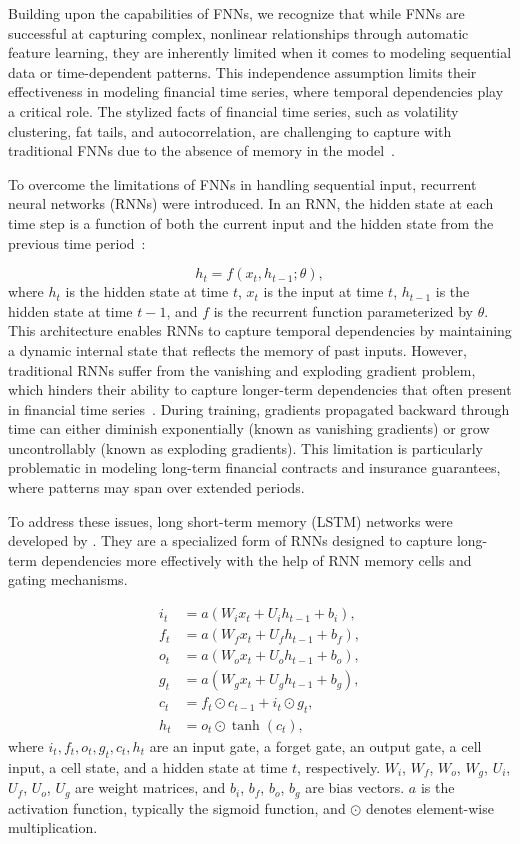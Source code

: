 Building upon the capabilities of FNNs, we recognize that while FNNs are successful at capturing complex, nonlinear relationships through automatic feature learning, they are inherently limited when it comes to modeling sequential data or time-dependent patterns. 
This independence assumption limits their effectiveness in modeling financial time series, where temporal dependencies play a critical role. 
The stylized facts of financial time series, such as volatility clustering, fat tails, and autocorrelation, are challenging to capture with traditional FNNs due to the absence of memory in the model~\citep{cont2001empirical}.

To overcome the limitations of FNNs in handling sequential input, recurrent neural networks (RNNs) were introduced.
In an RNN, the hidden state at each time step is a function of both the current input and the hidden state from the previous time period~\citep{elman1990finding}:

\begin{equation}
    h_t = f(x_t, h_{t-1}; \theta),
\end{equation}
where $h_t$ is the hidden state at time $t$, $x_t$ is the input at time $t$, $h_{t-1}$ is the hidden state at time $t-1$, and $f$ is the recurrent function parameterized by $\theta$.
This architecture enables RNNs to capture temporal dependencies by maintaining a dynamic internal state that reflects the memory of past inputs.
However, traditional RNNs suffer from the vanishing and exploding gradient problem, which hinders their ability to capture longer-term dependencies that often present in financial time series~\citep{bengio1994learning}.
During training, gradients propagated backward through time can either diminish exponentially (known as vanishing gradients) or grow uncontrollably (known as exploding gradients).
This limitation is particularly problematic in modeling long-term financial contracts and insurance guarantees, where patterns may span over extended periods.

To address these issues, long short-term memory (LSTM) networks were developed by \citet{hochreiter1997long}.
They are a specialized form of RNNs designed to capture long-term dependencies more effectively with the help of RNN memory cells and gating mechanisms.

\begin{align*}
    i_t &= a(W_i x_t + U_i h_{t-1} + b_i), \\
    f_t &= a(W_f x_t + U_f h_{t-1} + b_f), \\
    o_t &= a(W_o x_t + U_o h_{t-1} + b_o), \\
    g_t &= a(W_g x_t + U_g h_{t-1} + b_g), \\
    c_t &= f_t \odot c_{t-1} + i_t \odot g_t, \\
    h_t &= o_t \odot \tanh(c_t),
\end{align*}
where $i_t, f_t, o_t, g_t, c_t, h_t$ are an input gate, a forget gate, an output gate, a cell input, a cell state, and a hidden state at time $t$, respectively.
$W_i$, $W_f$, $W_o$, $W_g$, $U_i$, $U_f$, $U_o$, $U_g$ are weight matrices, and $b_i$, $b_f$, $b_o$, $b_g$ are bias vectors.
$a$ is the activation function, typically the sigmoid function, and $\odot$ denotes element-wise multiplication.

